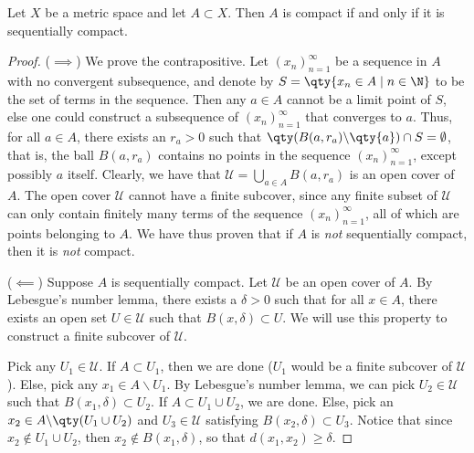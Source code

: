  \begin{theorem}
   Let \( X \) be a metric space and let \( A\subset X \). Then \( A \) is compact if and only if it is sequentially compact.
 \end{theorem}
 \begin{proof}
   (\( \implies \)) We prove the contrapositive. Let \((x_n)_{n=1}^\infty  \) be a sequence in \( A \) with no convergent subsequence, and denote by \( S=\qty{x_n\in A\mid n\in\N} \) to be the set of terms in the sequence. Then any \( a\in A \) cannot be a limit point of \( S \), else one could construct a subsequence of \( (x_n)_{n=1}^\infty \) that converges to \( a \). Thus, for all \( a\in A \), there exists an \( r_a>0 \) such that \( \qty(B(a,r_a)\backslash\qty{a})\cap S=\emptyset \), that is, the ball \( B(a,r_a) \) contains no points in the sequence \( (x_n)_{n=1}^\infty \), except possibly \( a \) itself. Clearly, we have that \( \mathcal{U}=\bigcup_{a\in A}B(a,r_a) \) is an open cover of \( A \). The open cover \( \mathcal{U} \) cannot have a finite subcover, since any finite subset of \( \mathcal{U} \) can only contain finitely many terms of the sequence \( (x_n)_{n=1}^\infty \), all of which are points belonging to \( A \). We have thus proven that if \( A \) is \emph{not} sequentially compact, then it is \emph{not} compact.

   \vspace{3mm}

   (\( \impliedby \)) Suppose \( A \) is sequentially compact. Let \( \mathcal{U} \) be an open cover of \( A \). By Lebesgue's number lemma, there exists a \( \delta>0 \) such that for all \( x\in A \), there exists an open set \( U\in\mathcal{U} \) such that \( B(x,\delta)\subset U \). We will use this property to construct a finite subcover of \( \mathcal{U} \).

   \vspace{3mm}

   Pick any \( U_1\in\mathcal{U} \). If \( A\subset U_1 \), then we are done (\( U_1 \) would be a finite subcover of \( \mathcal{U} \)). Else, pick any \( x_1\in A\backslash U_1 \). By Lebesgue's number lemma, we can pick \( U_2\in\mathcal{U} \) such that \( B(x_1,\delta)\subset U_2 \). If \( A\subset U_1\cup U_2 \), we are done. Else, pick an \( x_2\in A\backslash\qty(U_1\cup U_2) \) and \( U_3\in\mathcal{U} \) satisfying \( B(x_2,\delta)\subset U_3 \). Notice that since \( x_2\notin U_1\cup U_2 \), then \( x_2\notin B(x_1,\delta) \), so that \( d(x_1,x_2)\geq\delta \).


\end{proof}

